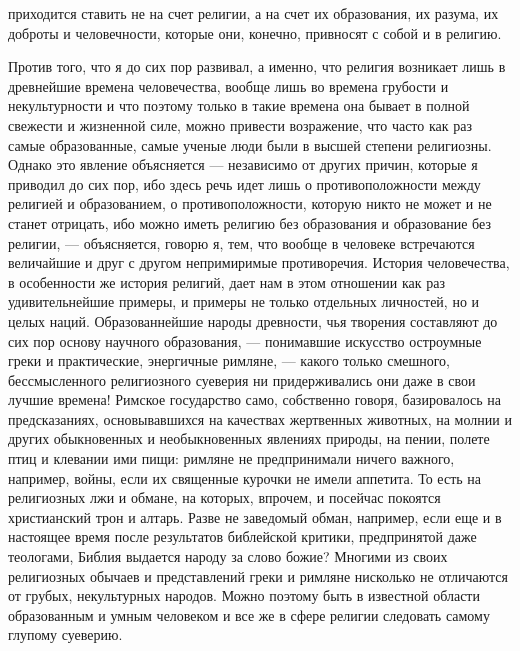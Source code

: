 \documentclass[12pt]{article}
\begin{document}
приходится ставить не на счет религии, а на счет их образования, их разума, их доброты и человечности, которые они, конечно, привносят с собой и в религию. 

Против того, что я до сих пор развивал, а именно, что религия возникает лишь в древнейшие времена человечества, вообще лишь во времена грубости и некультурности и что поэтому только в такие времена она бывает в полной свежести и жизненной силе, можно привести возражение, что часто как раз самые образованные, самые ученые люди были в высшей степени религиозны. Однако это явление объясняется --- независимо от других причин, которые я приводил до сих пор, ибо здесь речь идет лишь о противоположности между религией и образованием, о противоположности, которую никто не может и не станет отрицать, ибо можно иметь религию без образования и образование без религии, --- объясняется, говорю я, тем, что вообще в человеке встречаются величайшие и друг с другом непримиримые противоречия. История человечества, в особенности же история религий, дает нам в этом отношении как раз удивительнейшие примеры, и примеры не только отдельных личностей, но и целых наций. Образованнейшие народы древности, чья творения составляют до сих пор основу научного образования, --- понимавшие искусство остроумные греки и практические, энергичные римляне, --- какого только смешного, бессмысленного религиозного суеверия ни придерживались они даже в свои лучшие времена! Римское государство само, собственно говоря, базировалось на предсказаниях, основывавшихся на качествах жертвенных животных, на молнии и других обыкновенных и необыкновенных явлениях природы, на пении, полете птиц и клевании ими пищи: римляне не предпринимали ничего важного, например, войны, если их священные курочки не имели аппетита. То есть на религиозных лжи и обмане, на которых, впрочем, и посейчас покоятся христианский трон и алтарь. Разве не заведомый обман, например, если еще и в настоящее время после результатов библейской критики, предпринятой даже теологами, Библия выдается народу за слово божие? Многими из своих религиозных обычаев и представлений греки и римляне нисколько не отличаются от грубых, некультурных народов. Можно поэтому быть в известной области образованным и умным человеком и все же в сфере религии следовать самому глупому суеверию. 
\end{document}
